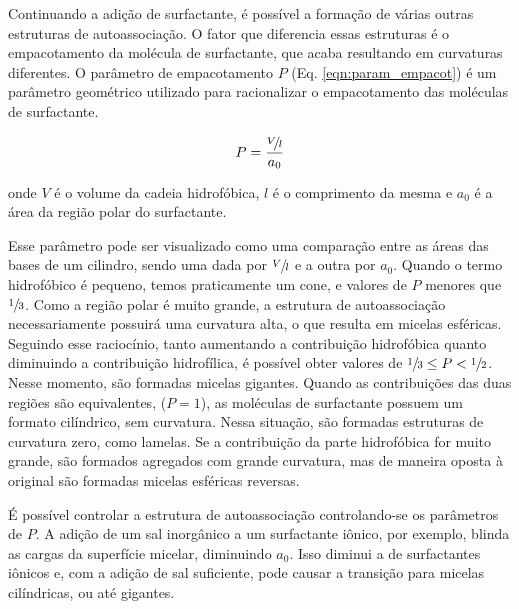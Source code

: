 	
	Continuando a adição de surfactante, é possível a formação de várias outras estruturas de autoassociação. O fator que diferencia essas estruturas é o empacotamento da molécula de surfactante, que acaba resultando em curvaturas diferentes. O parâmetro de empacotamento $P$ (Eq. \ref{eqn:param_empacot}) é um parâmetro geométrico utilizado para racionalizar o empacotamento das moléculas de surfactante.
	
	\begin{equation}
		P = \dfrac{\sfrac{V\!}{l}}{a_0}
		\label{eqn:param_empacot}
	\end{equation}
	
	\noindent onde $V$ é o volume da cadeia hidrofóbica, $l$ é o comprimento da mesma e $a_0$ é a área da região polar do surfactante.
	
	Esse parâmetro pode ser visualizado como uma comparação entre as áreas das bases de um cilindro, sendo uma dada por \(\sfrac{V}{l}\) e a outra por \(a_0\). Quando o termo hidrofóbico é pequeno, temos praticamente um cone, e valores de \(P\) menores que \(\sfrac{1}{3}\). Como a região polar é muito grande, a estrutura de autoassociação necessariamente possuirá uma curvatura alta, o que resulta em micelas esféricas. Seguindo esse raciocínio, tanto aumentando a contribuição hidrofóbica quanto diminuindo a contribuição hidrofílica, é possível obter valores de \(\sfrac{1}{3} \leq P < \sfrac{1}{2}\). Nesse momento, são formadas micelas gigantes. Quando as contribuições das duas regiões são equivalentes, (\(P = 1\)), as moléculas de surfactante possuem um formato cilíndrico, sem curvatura. Nessa situação, são formadas estruturas de curvatura zero, como lamelas. Se a contribuição da parte hidrofóbica for muito grande, são formados agregados com grande curvatura, mas de maneira oposta à original são formadas micelas esféricas reversas.
	
	
	É possível controlar a estrutura de autoassociação controlando-se os parâmetros de \(P\). A adição de um sal inorgânico a um surfactante iônico, por exemplo, blinda as cargas da superfície micelar, diminuindo \(a_0\). Isso diminui a \cmc{} de surfactantes iônicos e, com a adição de sal suficiente, pode causar a transição para micelas cilíndricas, ou até gigantes.
	
